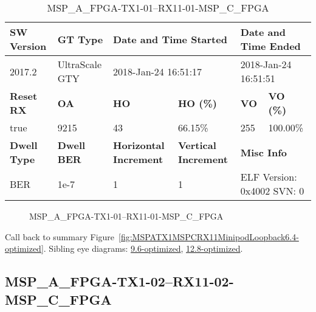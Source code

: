 \begin{table}[h]
\centering
\caption{MSP\_A\_FPGA-TX1-01--RX11-01-MSP\_C\_FPGA}
\label{tab:MSPAFPGATX101RX1101MSPCFPGA6.4-optimized}
\begin{tabular}{@{}|l|l|l|l|l|l|@{}}
\toprule
\textbf{SW Version}                & \textbf{GT Type}   & \multicolumn{2}{l|}{\textbf{Date and Time Started}}            & \multicolumn{2}{l|}{\textbf{Date and Time Ended}}        \\ \midrule
2017.2                       & UltraScale GTY          & \multicolumn{2}{l|}{2018-Jan-24 16:51:17}                   & \multicolumn{2}{l|}{2018-Jan-24 16:51:51}               \\ \midrule
\textbf{Reset RX}                  & \textbf{OA} & \textbf{HO}   & \textbf{HO (\%)} & \textbf{VO} & \textbf{VO (\%)} \\ \midrule
true & 9215        & 43          & 66.15\%        & 255        & 100.00\%       \\ \midrule
\textbf{Dwell Type}                & \textbf{Dwell BER} & \textbf{Horizontal Increment} & \textbf{Vertical Increment}    & \multicolumn{2}{l|}{\textbf{Misc Info}}                  \\ \midrule
BER                            & 1e-7        & 1        & 1           & \multicolumn{2}{l|}{ELF Version: 0x4002 SVN: 0}                         \\ \bottomrule
\end{tabular}
\end{table}

\begin{figure}[h]
\caption{MSP\_A\_FPGA-TX1-01--RX11-01-MSP\_C\_FPGA} \label{fig:MSPAFPGATX101RX1101MSPCFPGA6.4-optimized}
\end{figure}

Call back to summary Figure~\ref{fig:MSPATX1MSPCRX11MinipodLoopback6.4-optimized}.
Sibling eye diagrams: \hyperref[sec:MSPAFPGATX101RX1101MSPCFPGA9.6-optimized]{9.6-optimized}, \hyperref[sec:MSPAFPGATX101RX1101MSPCFPGA12.8-optimized]{12.8-optimized}.

\clearpage
\newpage


\subsection{MSP\_A\_FPGA-TX1-02--RX11-02-MSP\_C\_FPGA}\label{sec:MSPAFPGATX102RX1102MSPCFPGA6.4-optimized}

